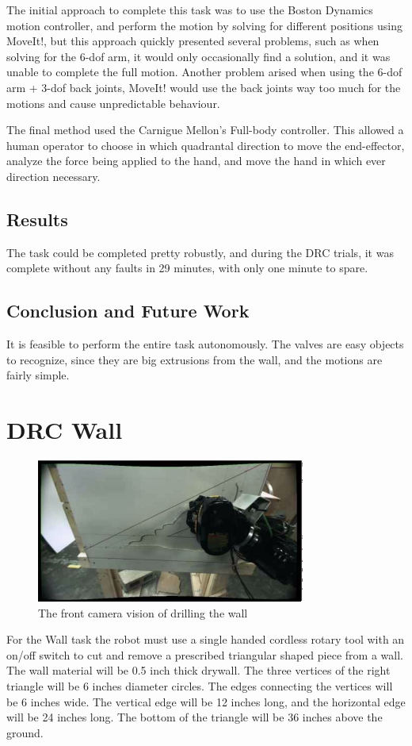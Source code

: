 \documentclass[12pt]{report}
\begin{document}
The initial approach to complete this task was to use the Boston Dynamics motion controller, and perform the motion by solving for different positions using MoveIt!, but this approach quickly presented several problems, such as when solving for the 6-dof arm, it would only occasionally find a solution, and it was unable to complete the full motion. Another problem arised when using the 6-dof arm + 3-dof back joints, MoveIt! would use the back joints way too much for the motions and cause unpredictable behaviour. 

The final method used the Carnigue Mellon's Full-body controller. This allowed a human operator to choose in which quadrantal direction to move the end-effector, analyze the force being applied to the hand, and move the hand in which ever direction necessary. 

\subsection{Results}
The task could be completed pretty robustly, and during the DRC trials, it was complete without any faults in 29 minutes, with only one minute to spare. 

\subsection{Conclusion and Future Work}
It is feasible to perform the entire task autonomously. The valves are easy objects to recognize, since they are big extrusions from the wall, and the motions are fairly simple. 

\section{DRC Wall}
\begin{figure}
  \begin{center}
    \includegraphics[scale=0.5]{images/drilling2.png}
  \end{center}
  \caption{The front camera vision of drilling the wall}
\end{figure}
For the Wall task the robot must use a single handed cordless rotary tool with an on/off switch to cut and remove a prescribed triangular shaped piece from a wall. The wall material will be 0.5 inch thick drywall. The three vertices of the right triangle will be 6 inches diameter circles. The edges connecting the vertices will be 6 inches wide. The vertical edge will be 12 inches long, and the horizontal edge will be 24 inches long. The bottom of the triangle will be 36 inches above the ground. \cite{walltask}
\end{document}
